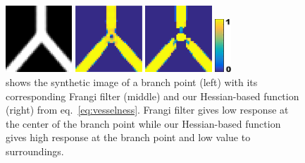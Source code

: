 \documentclass{article}
\begin{document}
\begin{figure}[b!]
	\centering
	\begin{minipage}[b]{0.22\linewidth}
		\centerline{\includegraphics[height=2.5cm]{img/branch.png}}
	\end{minipage}
	\begin{minipage}[b]{0.22\linewidth}
		\centerline{\includegraphics[height=2.5cm]{img/branch_frangi.png}}
	\end{minipage}
	\begin{minipage}[b]{0.22\linewidth}
		\centerline{\includegraphics[height=2.5cm]{img/branch_hessian.png}}
	\end{minipage}
	\hspace{-10pt}
	\begin{minipage}[b]{0.08\linewidth}
		\centerline{\includegraphics[height=2cm]{img/colorbar.png}}
		\vspace{7pt}
	\end{minipage}
	\vspace{-10pt}
	\caption{\small{shows the synthetic image of a branch point (left) with its corresponding Frangi filter (middle) and our Hessian-based function (right) from eq.~\ref{eq:vesselness}. Frangi filter gives low response at the center of the branch point while our Hessian-based function gives high response at the branch point and low value to surroundings. }}
	\label{fig:vesselness}
	\vspace{-10pt}
\end{figure}
\end{document}
